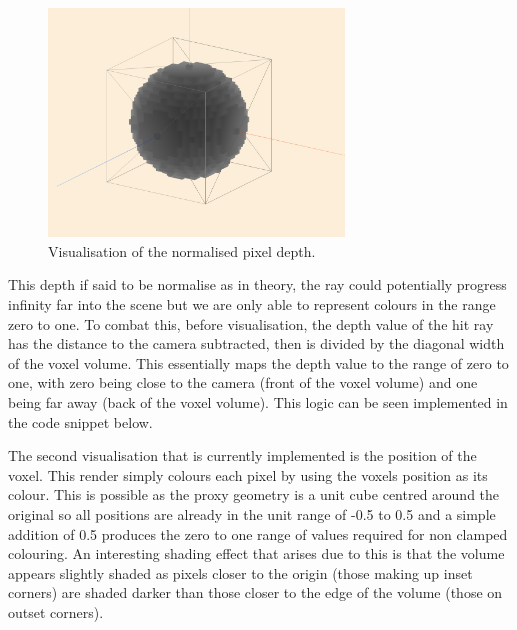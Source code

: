 \documentclass[titlepage]{article}
\begin{document}
\begin{figure}[htp]
  \centering
  \includegraphics[width=0.7\textwidth]{depth.png}
  \caption{Visualisation of the normalised pixel depth.}
\end{figure}
\FloatBarrier

This depth if said to be normalise as in theory, the ray could potentially progress infinity far into the scene but we are only able to represent colours in the range zero to one. To combat this, before visualisation, the depth value of the hit ray has the distance to the camera subtracted, then is divided by the diagonal width of the voxel volume. This essentially maps the depth value to the range of zero to one, with zero being close to the camera (front of the voxel volume) and one being far away (back of the voxel volume). This logic can be seen implemented in the code snippet below.



The second visualisation that is currently implemented is the position of the voxel. This render simply colours each pixel by using the voxels position as its colour. This is possible as the proxy geometry is a unit cube centred around the original so all positions are already in the unit range of -0.5 to 0.5 and a simple addition of 0.5 produces the zero to one range of values required for non clamped colouring. An interesting shading effect that arises due to this is that the volume appears slightly shaded as pixels closer to the origin (those making up inset corners) are shaded darker than those closer to the edge of the volume (those on outset corners).
\end{document}
